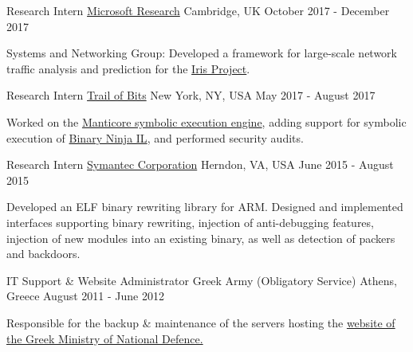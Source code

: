 \begin{cventries}
{\begin{cvitems}
{    }
      \end{cvitems}
    }
\vspace{0.1in}
  \cventry
    {Research Intern}
		{\href{https://www.microsoft.com/en-us/research/lab/microsoft-research-cambridge/}{Microsoft Research}} %
    {Cambridge, UK}
    {October 2017 - December 2017}
    {
      \begin{cvitems} %
      \item[] {Systems and Networking Group: Developed a framework for
          large-scale network traffic analysis and prediction for the
              \href{https://www.microsoft.com/en-us/research/project/iris}{Iris Project}.}
      \end{cvitems}
    }

\vspace{0.1in}

\cventry
    {Research Intern} %
		{\href{May 2017 - August 2017}{Trail of Bits}} %
    {New York, NY, USA}
    {May 2017 - August 2017}
    {
      \begin{cvitems} %
      \item[] {Worked on the \href{https://github.com/trailofbits/manticore}{Manticore symbolic execution engine}, adding support
          for symbolic execution of \href{https://binary.ninja/}{Binary Ninja IL}, and performed security audits.}
      \end{cvitems}
    }

\vspace{0.1in}

  \cventry
    {Research Intern} %
		{\href{May 2015 - August 2015}{Symantec Corporation}} %
    {Herndon, VA, USA}
    {June 2015 - August 2015}
    {
      \begin{cvitems} %
      \item[] {Developed an ELF binary rewriting library for ARM. Designed and
            implemented interfaces supporting binary rewriting, injection of
              anti-debugging features, injection of new modules into an existing
              binary, as well as detection of packers and backdoors.}
      \end{cvitems}
    }


\vspace{0.1in}

  \cventry
{IT Support \& Website Administrator} %
		{Greek Army (Obligatory Service)} %
    {Athens, Greece} %
    {August 2011 - June 2012} %
		{
      \begin{cvitems} %
      \item[] {Responsible for the backup \& maintenance of the servers hosting
          the \href{http://www.mod.mil.gr/mod/en/}{website of the Greek Ministry of National Defence.}}
      \end{cvitems}
        }



\end{cventries}
